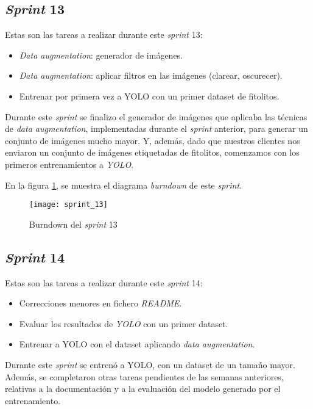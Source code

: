 \subsection{\textit{Sprint} 13}

Estas son las tareas a realizar durante este \textit{sprint} 13:

\begin{itemize}
	\item \textit{Data augmentation}: generador de imágenes.
	\item \textit{Data augmentation}: aplicar filtros en las imágenes (clarear, oscurecer).
	\item Entrenar por primera vez a YOLO con un primer dataset de fitolitos.
\end{itemize}

Durante este \textit{sprint} se finalizo el generador de imágenes que aplicaba las técnicas de \textit{data augmentation}, implementadas durante el \textit{sprint} anterior, para generar un conjunto de imágenes mucho mayor. Y, además, dado que nuestros clientes nos enviaron un conjunto de imágenes etiquetadas de fitolitos, comenzamos con los primeros entrenamientos a \textit{YOLO}.

En la figura \ref{fig:A.1.14}, se muestra el diagrama \textit{burndown} de este \textit{sprint}.

\begin{figure}
\centering
\texttt{[image: sprint\_13]}
\caption{Burndown del \textit{sprint} 13}
\label{fig:A.1.14}
\end{figure}

\subsection{\textit{Sprint} 14}

Estas son las tareas a realizar durante este \textit{sprint} 14:

\begin{itemize}
	\item Correcciones menores en fichero \textit{README}.
	\item Evaluar los resultados de \textit{YOLO} con un primer dataset.
	\item Entrenar a YOLO con el dataset aplicando \textit{data augmentation}.
\end{itemize}

Durante este \textit{sprint} se entrenó a YOLO, con un dataset de un tamaño mayor. Además, se completaron otras tareas pendientes de las semanas anteriores, relativas a la documentación y a la evaluación del modelo generado por el entrenamiento.


